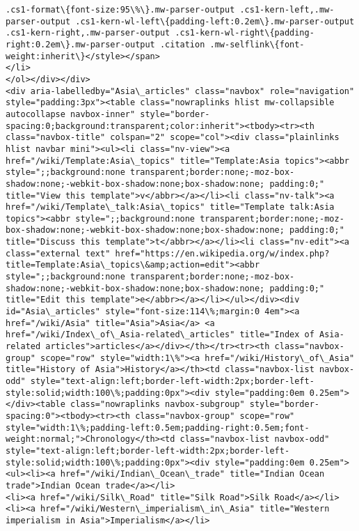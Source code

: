 \documentclass[11pt]{article}
\begin{document}
\begin{Verbatim}[commandchars=\\\{\}]
.cs1-format\{font-size:95\%\}.mw-parser-output .cs1-kern-left,.mw-parser-output .cs1-kern-wl-left\{padding-left:0.2em\}.mw-parser-output .cs1-kern-right,.mw-parser-output .cs1-kern-wl-right\{padding-right:0.2em\}.mw-parser-output .citation .mw-selflink\{font-weight:inherit\}</style></span>
</li>
</ol></div></div>
<div aria-labelledby="Asia\_articles" class="navbox" role="navigation" style="padding:3px"><table class="nowraplinks hlist mw-collapsible autocollapse navbox-inner" style="border-spacing:0;background:transparent;color:inherit"><tbody><tr><th class="navbox-title" colspan="2" scope="col"><div class="plainlinks hlist navbar mini"><ul><li class="nv-view"><a href="/wiki/Template:Asia\_topics" title="Template:Asia topics"><abbr style=";;background:none transparent;border:none;-moz-box-shadow:none;-webkit-box-shadow:none;box-shadow:none; padding:0;" title="View this template">v</abbr></a></li><li class="nv-talk"><a href="/wiki/Template\_talk:Asia\_topics" title="Template talk:Asia topics"><abbr style=";;background:none transparent;border:none;-moz-box-shadow:none;-webkit-box-shadow:none;box-shadow:none; padding:0;" title="Discuss this template">t</abbr></a></li><li class="nv-edit"><a class="external text" href="https://en.wikipedia.org/w/index.php?title=Template:Asia\_topics\&amp;action=edit"><abbr style=";;background:none transparent;border:none;-moz-box-shadow:none;-webkit-box-shadow:none;box-shadow:none; padding:0;" title="Edit this template">e</abbr></a></li></ul></div><div id="Asia\_articles" style="font-size:114\%;margin:0 4em"><a href="/wiki/Asia" title="Asia">Asia</a> <a href="/wiki/Index\_of\_Asia-related\_articles" title="Index of Asia-related articles">articles</a></div></th></tr><tr><th class="navbox-group" scope="row" style="width:1\%"><a href="/wiki/History\_of\_Asia" title="History of Asia">History</a></th><td class="navbox-list navbox-odd" style="text-align:left;border-left-width:2px;border-left-style:solid;width:100\%;padding:0px"><div style="padding:0em 0.25em"></div><table class="nowraplinks navbox-subgroup" style="border-spacing:0"><tbody><tr><th class="navbox-group" scope="row" style="width:1\%;padding-left:0.5em;padding-right:0.5em;font-weight:normal;">Chronology</th><td class="navbox-list navbox-odd" style="text-align:left;border-left-width:2px;border-left-style:solid;width:100\%;padding:0px"><div style="padding:0em 0.25em">
<ul><li><a href="/wiki/Indian\_Ocean\_trade" title="Indian Ocean trade">Indian Ocean trade</a></li>
<li><a href="/wiki/Silk\_Road" title="Silk Road">Silk Road</a></li>
<li><a href="/wiki/Western\_imperialism\_in\_Asia" title="Western imperialism in Asia">Imperialism</a></li>

\end{Verbatim}
\end{document}
